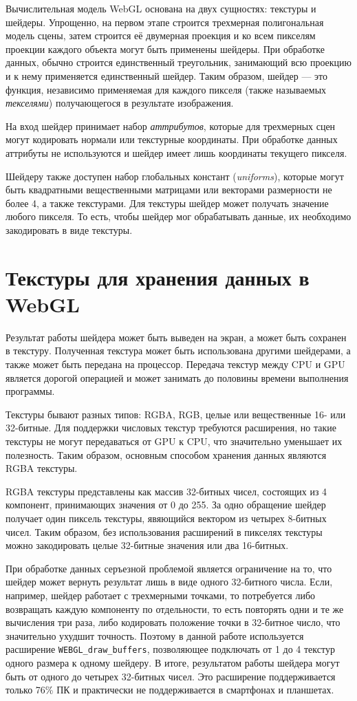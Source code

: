 Вычислительная модель WebGL основана на двух сущностях: текстуры и шейдеры. Упрощенно, на первом этапе строится трехмерная полигональная модель сцены, затем строится её двумерная проекция и ко всем пикселям проекции каждого объекта могут быть применены шейдеры. При обработке данных, обычно строится единственный треугольник, занимающий всю проекцию и к нему применяется единственный шейдер. Таким образом, шейдер --- это функция, независимо применяемая для каждого пикселя (также называемых {\itshape текселями}) получающегося в результате изображения.

На вход шейдер принимает набор {\itshape аттрибутов}, которые для трехмерных сцен могут кодировать нормали или текстурные координаты. При обработке данных аттрибуты не используются и шейдер имеет лишь координаты текущего пикселя.

Шейдеру также доступен набор глобальных констант ({\itshape uniforms}), которые могут быть квадратными вещественными матрицами или векторами размерности не более 4, а также текстурами. Для текстуры шейдер может получать значение любого пикселя. То есть, чтобы шейдер мог обрабатывать данные, их необходимо закодировать в виде текстуры.

\section{Текстуры для хранения данных в WebGL}

Результат работы шейдера может быть выведен на экран, а может быть сохранен в текстуру. Полученная текстура может быть использована другими шейдерами, а также может быть передана на процессор. Передача текстур между CPU и GPU является дорогой операцией и может занимать до половины времени выполнения программы.

Текстуры бывают разных типов: RGBA, RGB, целые или вещественные 16- или 32-битные. Для поддержки числовых текстур требуются расширения, но такие текстуры не могут передаваться от GPU к CPU, что значительно уменьшает их полезность. Таким образом, основным способом хранения данных являются RGBA текстуры.

RGBA текстуры представлены как массив 32-битных чисел, состоящих из 4 компонент, принимающих значения от 0 до 255. За одно обращение шейдер получает один пиксель текстуры, явяющийся вектором из четырех 8-битных чисел. Таким образом, без использования расширений в пикселях текстуры можно закодировать целые 32-битные значения или два 16-битных.

При обработке данных серъезной проблемой является ограничение на то, что шейдер может вернуть результат лишь в виде одного 32-битного числа. Если, например, шейдер работает с трехмерными точками, то потребуется либо возвращать каждую компоненту по отдельности, то есть повторять одни и те же вычисления три раза, либо кодировать положение точки в 32-битное число, что значительно ухудшит точность. Поэтому в данной работе используется расширение \texttt{WEBGL\_draw\_buffers}, позволяющее подключать от 1 до 4 текстур одного размера к одному шейдеру. В итоге, результатом работы шейдера могут быть от одного до четырех 32-битных чисел. Это расширение поддерживается только 76\% ПК и практически не поддерживается в смартфонах и планшетах.

